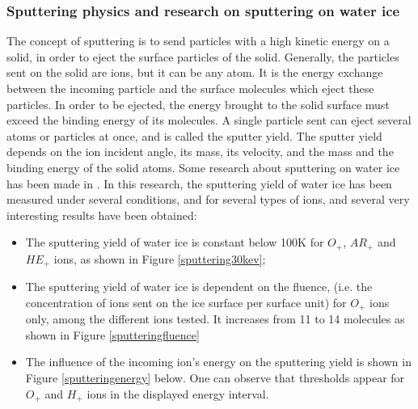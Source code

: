 
\subsubsection{Sputtering physics and research on sputtering on water ice}

The concept of sputtering is to send particles with a high kinetic energy on a solid, in order to eject the surface particles of the solid. Generally, the particles sent on the solid are ions, but it can be any atom. It is the energy exchange between the incoming particle and the surface molecules which eject these particles. In order to be ejected, the energy brought to the solid surface must exceed the binding energy of its molecules. A single particle sent can eject several atoms or particles at once, and is called the sputter yield. The sputter yield depends on the ion incident angle, its mass, its velocity, and the mass and the binding energy of the solid atoms. Some research about sputtering on water ice has been made in \cite{baragiola2003sputtering}.
In this research, the sputtering yield of water ice has been measured under several conditions, and for several types of ions, and several very interesting results have been obtained:

\begin{itemize}
    \item{The sputtering yield of water ice is constant below 100K for $O_{+}$, $AR_{+}$ and $HE_{+}$ ions, as shown in Figure \ref{sputtering30kev};}
    
    \item{The sputtering yield of water ice is dependent on the fluence, (i.e. the concentration of ions sent on the ice surface per surface unit) for $O_{+}$ ions only, among the different ions tested. It increases from 11 to 14 molecules as shown in Figure \ref{sputteringfluence}}

    \item{The influence of the incoming ion's energy on the sputtering yield is shown in Figure \ref{sputteringenergy} below. One can observe that thresholds appear for $O_{+}$ and $H_{+}$ ions in the displayed energy interval.}
\end{itemize}
    
